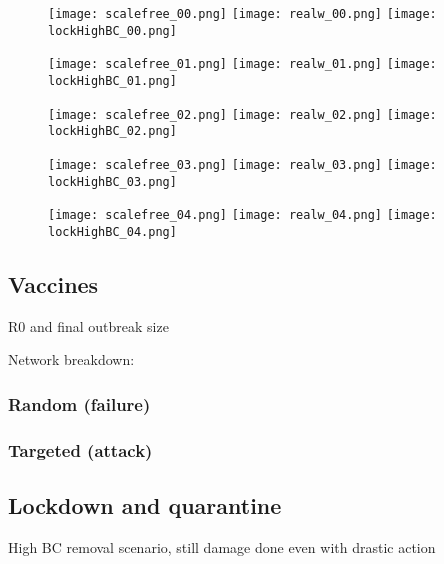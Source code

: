 \documentclass[DIV=12, BCOR=0pt]{scrartcl}  %
\begin{document}
   
   \clearpage
   
   \begin{figure}[h!]
   	\centering
   	\texttt{[image: scalefree\_00.png]}
   	\texttt{[image: realw\_00.png]}
   	\texttt{[image: lockHighBC\_00.png]}
   	
   	\texttt{[image: scalefree\_01.png]}
   	\texttt{[image: realw\_01.png]}
   	\texttt{[image: lockHighBC\_01.png]}
   	\caption{ }
   	\label{fig:networks1}
   \end{figure}  	
   
   \begin{figure}[h!]
   	\centering
   	\texttt{[image: scalefree\_02.png]}
   	\texttt{[image: realw\_02.png]}
   	\texttt{[image: lockHighBC\_02.png]}
   	
   	\texttt{[image: scalefree\_03.png]}
   	\texttt{[image: realw\_03.png]}
   	\texttt{[image: lockHighBC\_03.png]}
   	
   	\texttt{[image: scalefree\_04.png]}
   	\texttt{[image: realw\_04.png]}
   	\texttt{[image: lockHighBC\_04.png]}
   	
   	\caption{ }
   	\label{fig:outcomes1}
   \end{figure}
   
  
  \subsection{Vaccines}
  R0 and final outbreak size
  
  Network breakdown:
  \subsubsection{Random (failure)}
	\subsubsection{Targeted (attack)}

	\subsection{Lockdown and quarantine}
	High BC removal scenario, still damage done even with drastic action
	
\end{document}
